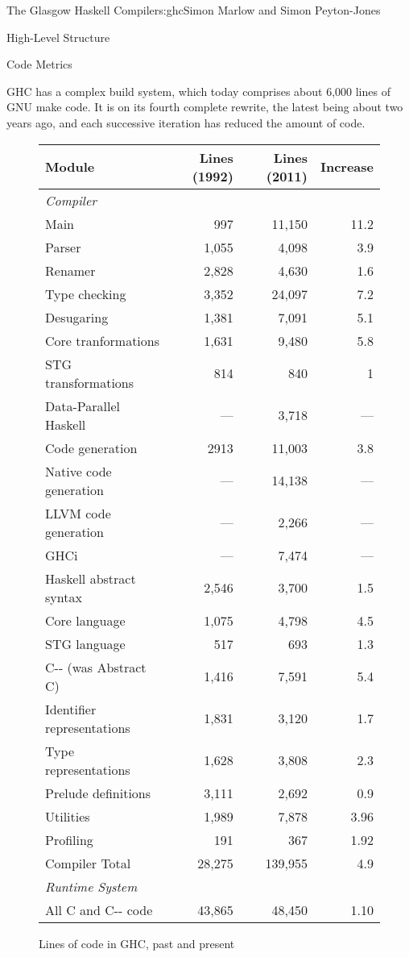 \begin{aosachapter}{The Glasgow Haskell Compiler}{s:ghc}{Simon Marlow and Simon Peyton-Jones}
\begin{aosasect1}{High-Level Structure}
\begin{aosasect2}{Code Metrics}
\begin{aosaitemize}
\item GHC has a complex build system, which today comprises about
  6,000 lines of GNU make code.  It is on its fourth complete rewrite,
  the latest being about two years ago, and each successive iteration
  has reduced the amount of code.

\end{aosaitemize}

\begin{figure}
\begin{tabular}{|lrrr|}
\hline
Module & Lines (1992) & Lines (2011) & Increase \\
\hline
\multicolumn{4}{|l|}{\emph{Compiler}} \\
Main    & 997 & 11,150 & 11.2 \\
Parser  & 1,055 & 4,098 & 3.9 \\
Renamer & 2,828 & 4,630 & 1.6 \\
Type checking & 3,352 & 24,097 & 7.2 \\
Desugaring & 1,381 & 7,091 & 5.1 \\
Core tranformations & 1,631 & 9,480 & 5.8 \\
STG transformations & 814 & 840 & 1 \\
Data-Parallel Haskell & --- & 3,718 & --- \\
Code generation & 2913 & 11,003 & 3.8 \\
Native code generation & --- & 14,138 & --- \\
LLVM code generation & --- & 2,266 & --- \\
GHCi & --- & 7,474 & --- \\
Haskell abstract syntax & 2,546 & 3,700 & 1.5 \\
Core language & 1,075 & 4,798 & 4.5 \\
STG language & 517 & 693 & 1.3 \\
C{-}{-} (was Abstract C)  & 1,416 & 7,591 & 5.4 \\
Identifier representations & 1,831 & 3,120 & 1.7 \\
Type representations & 1,628 & 3,808 & 2.3 \\
Prelude definitions & 3,111 & 2,692 & 0.9 \\
Utilities & 1,989 & 7,878 & 3.96 \\
Profiling & 191 & 367 & 1.92 \\
\hline
Compiler Total  & 28,275 & 139,955 & 4.9 \\ \hline
\hline
\multicolumn{4}{|l|}{\emph{Runtime System}} \\
All C and C{-}{-} code & 43,865 & 48,450 & 1.10 \\
\hline
\end{tabular}
\caption{Lines of code in GHC, past and present}
\label{f:lines}
\end{figure}


\end{aosasect2}
\end{aosasect1}
\end{aosachapter}
